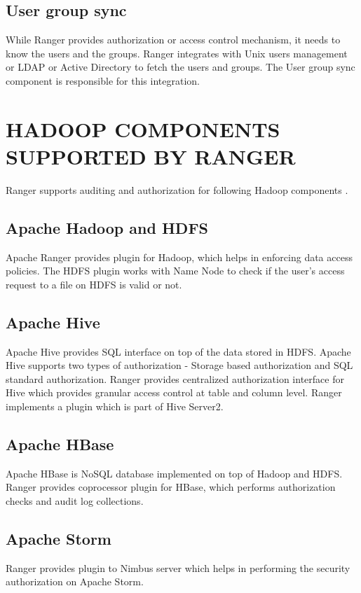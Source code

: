 \documentclass[9pt,twocolumn,twoside]{../../styles/osajnl}
\begin{document}
\subsection{User group sync}

While Ranger provides authorization or access control mechanism, it needs to
know the users and the groups. Ranger integrates with Unix users management or
LDAP or Active Directory to fetch the users and groups. The User group sync
component is responsible for this integration.

\section{HADOOP COMPONENTS SUPPORTED BY RANGER}

Ranger supports auditing and authorization for following Hadoop components
\cite{www-ranger-faq}.

\subsection{Apache Hadoop and HDFS}

Apache Ranger provides plugin for Hadoop, which helps in enforcing data access
policies. The HDFS plugin works with Name Node to check if the user's access
request to a file on HDFS is valid or not.

\subsection{Apache Hive}

Apache Hive provides SQL interface on top of the data stored in HDFS. Apache
Hive supports two types of authorization - Storage based authorization and
SQL standard authorization. Ranger provides centralized authorization
interface for Hive which provides granular access control at table and column
 level. Ranger implements a plugin which is part of Hive Server2.

\subsection{Apache HBase}
Apache HBase is NoSQL database implemented on top of Hadoop and HDFS. Ranger
provides coprocessor plugin for HBase, which performs authorization checks and
 audit log collections.

\subsection{Apache Storm}
Ranger provides plugin to Nimbus server which helps in performing the
security authorization on Apache Storm.
\end{document}

